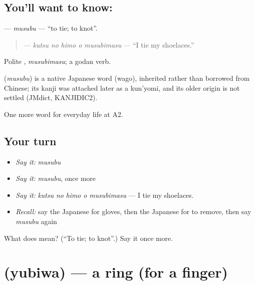\subsection*{You'll want to know: }
\textbf{} — \emph{musubu} — \textquotedblleft{}to tie; to knot\textquotedblright{}.

\begin{quote}
\textbf{  } — \emph{kutsu no himo o musubimasu} — \textquotedblleft{}I tie my shoelaces.\textquotedblright{}
\end{quote}

Polite \textbf{}, \emph{musubimasu}; a godan verb.

\begin{cousinweb}
\textbf{} (\emph{musubu}) is a native Japanese word (wago), inherited rather than borrowed from Chinese; its kanji was attached later as a kun'yomi, and its older origin is not settled (JMdict, KANJIDIC2).
\end{cousinweb}

\begin{grammarlens}[title={What you've built}]
One more word for everyday life at A2.
\end{grammarlens}

\subsection*{Your turn}
\begin{itemize}
\raggedright
  \item \emph{Say it:} \emph{musubu}
  \item \emph{Say it:} \emph{musubu}, once more
  \item \emph{Say it:} \emph{kutsu no himo o musubimasu} — I tie my shoelaces.
  \item \emph{Recall:} say the Japanese for gloves, then the Japanese for to remove, then say \emph{musubu} again
\end{itemize}

\begin{tcolorbox}[breakable,colback=teal!4,colframe=teal!35!black,title={Before you move on}]
What does  mean? (\textquotedblleft{}To tie; to knot\textquotedblright{}.) Say it once more.
\end{tcolorbox}
\section[\texorpdfstring{\ja{ゆびわ} (yubiwa)}{ゆびわ (yubiwa)}]{ (yubiwa) — a ring (for a finger)}

